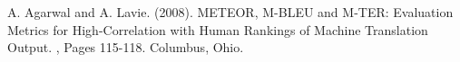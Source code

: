 \documentclass[11pt]{article}
\begin{document}
\begin{thebibliography}{}
A. Agarwal and A. Lavie.
\newblock (2008).
\newblock METEOR, M-BLEU and M-TER: Evaluation Metrics for High-Correlation with Human Rankings of Machine Translation Output.
,
Pages 115-118.
\newblock Columbus, Ohio.











\end{thebibliography}
\end{document}
